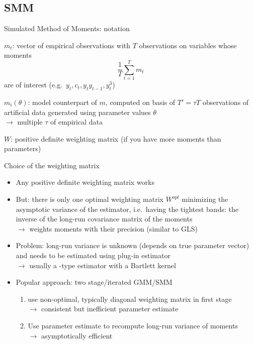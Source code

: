\subsection{SMM}

\begin{frame}{Simulated Method of Moments: notation}

  \begin{witemize}
    \item $m_t$: vector of empirical observations with $T$ observations on variables whose moments
    \begin{equation}
      \frac{1}{T} \sum_{t=1}^{T} m_t
    \end{equation}
    are of interest (e.g.\ $ y_t, c_t, y_{t}y_{t-1}, y_t^3 $)
    \item $m_i(\theta)$: model counterpart of $m$, computed on basis of $T'=\tau T$ observations of artificial data generated using parameter values $\theta $\\
    $\rightarrow$ multiple $\tau$ of empirical data
    \item $W$: positive definite weighting matrix (if you have more moments than parameters)

  \end{witemize}
\end{frame}

\begin{frame}{Choice of the weighting matrix}
  \begin{itemize}
    \item Any positive definite weighting matrix works
    \item But: there is only one optimal weighting matrix $W^{opt}$ minimizing the asymptotic variance of the estimator, i.e.\ having the tightest bands: the inverse of the long-run covariance matrix of the moments\\
          $\rightarrow$ weights moments with their precision (similar to GLS)
    \item Problem: long-run variance is unknown (depends on true parameter vector) and needs to be estimated using plug-in estimator\\
          $\rightarrow$ usually a \textcite{NeweyWest1987}-type estimator with a Bartlett kernel
    \item Popular approach: two stage/iterated GMM/SMM
          \begin{enumerate}
            \item use non-optimal, typically diagonal weighting matrix in first stage\\
                  $\rightarrow$ consistent but inefficient parameter estimate
            \item Use parameter estimate to recompute long-run variance of moments\\
                  $\rightarrow$ asymptotically efficient
          \end{enumerate}
  \end{itemize}
\end{frame}



